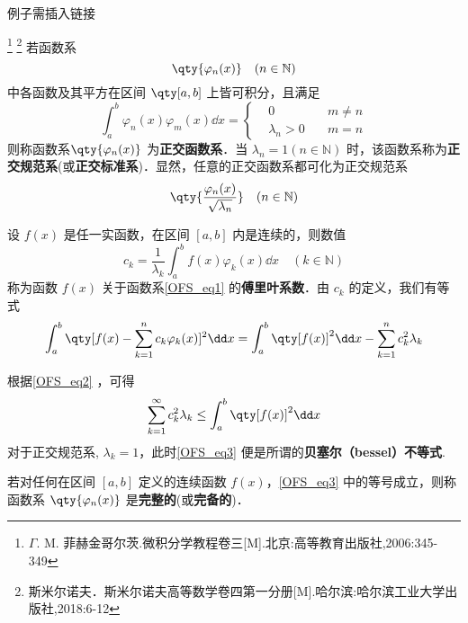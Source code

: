\begin{issues}
例子需插入链接
\end{issues}

\footnote{$\Gamma$. M. 菲赫金哥尔茨.微积分学教程\;卷三[M].北京:高等教育出版社,2006:345-349}
\footnote{斯米尔诺夫．斯米尔诺夫高等数学卷四第一分册[M].哈尔滨:哈尔滨工业大学出版社,2018:6-12}
若函数系 
\begin{equation}\label{OFS_eq1}
\qty{\varphi_n(x)}\quad(n\in \mathbb{N})
\end{equation}
中各函数及其平方在区间 $\qty[a,b]$ 上皆可积分，且满足
\begin{equation}
\int_a^b\varphi_n(x)\varphi_m(x)\dd x=
\left\{
    \begin{aligned}
    &0\quad &m\neq n\\
   &\lambda_n>0\quad &m=n
    \end{aligned}
\right.
\end{equation}
则称函数系$\qty{\varphi_n(x)}$ 为\textbf{正交函数系}．当 $\lambda_n=1(n\in\mathbb{N})$ 时，该函数系称为\textbf{正交规范系}(或\textbf{正交标准系})．显然，任意的正交函数系都可化为正交规范系 
\begin{equation}
\qty{\frac{\varphi_n(x)}{\sqrt{\lambda_n}}}\quad(n\in \mathbb{N})
\end{equation}

设 $f(x)$ 是任一实函数，在区间 $[a,b]$ 内是连续的，则数值
\begin{equation}
c_k=\frac{1}{\lambda_k}\int_a^b f(x)\varphi_k(x)\dd x\quad (k\in \mathbb{N})
\end{equation}
称为函数 $f(x)$ 关于函数系\autoref{OFS_eq1} 的\textbf{傅里叶系数}．由 $c_k$ 的定义，我们有等式
\begin{equation}\label{OFS_eq2}
\int_a^b\qty[f(x)-\sum_{k=1}^nc_k\varphi_k(x)]^2\dd x=\int_a^b\qty[f(x)]^2\dd x-\sum_{k=1}^nc_k^2\lambda_k
\end{equation}

根据\autoref{OFS_eq2} ，可得
\begin{equation}\label{OFS_eq3}
\sum_{k=1}^\infty c_k^2\lambda_k\leq\int_a^b\qty[f(x)]^2\dd x
\end{equation}
对于正交规范系, $\lambda_k=1$，此时\autoref{OFS_eq3} 便是所谓的\textbf{贝塞尔（bessel）不等式}. 

若对任何在区间 $[a,b]$ 定义的连续函数 $f(x)$，\autoref{OFS_eq3} 中的等号成立，则称函数系 $\qty{\varphi_n(x)}$ 是\textbf{完整的}(或\textbf{完备的})．
